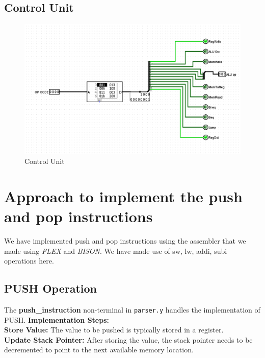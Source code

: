\documentclass[a4paper]{article}
\begin{document}
\subsection{Control Unit}
\vspace{0.5cm}
\begin{figure}[H]
    \centering
    \includegraphics[width=1\linewidth]{controlUnit.png}
    \caption{Control Unit} 
\end{figure}

\section{Approach to implement the push and pop instructions}
\vspace{0.4cm}
We have implemented push and pop instructions using the assembler that we made using \textit{FLEX} and \textit{BISON}. We have made use of sw, lw, addi, subi operations here.
\newpage
\subsection{PUSH Operation}
\vspace{0.4cm}
The \textbf{push\_instruction} non-terminal in \texttt{parser.y} handles the implementation of PUSH.
\vspace{0.5cm}
\textbf{Implementation Steps:}\\
\textbf{Store Value:} The value to be pushed is typically stored in a register.\\
\textbf{Update Stack Pointer:} After storing the value, the stack pointer needs to be decremented to point to the next available memory location.\\
\end{document}
